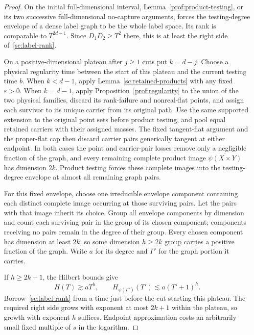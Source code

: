 \begin{proof}
On the initial full-dimensional interval,
Lemma~\ref{prof:product-testing}, or its two successive
full-dimensional no-capture arguments, forces the testing-degree
envelope of a dense label graph to be the whole label space.
Its rank is comparable to $T^{2d-1}$.  Since $D_1D_2\ge T^2$
there, this is at least the right side of~\eqref{sc:label-rank}.

On a positive-dimensional plateau after $j\ge1$ cuts put
$k=d-j$.  Choose a physical regularity time between the start of this
plateau and the current testing time $b$.
When $k<d-1$, apply Lemma~\ref{sc:retained-products} with any fixed
$\varepsilon>0$.  When $k=d-1$, apply
Proposition~\ref{prof:regularity} to the union of the two physical
families, discard its rank-failure and nonreal-flat points, and assign each
survivor to its unique carrier from its original path.  Use the same
supported extension to the original point sets before product testing,
and pool equal retained carriers with their assigned masses.  The fixed
tangent-flat argument and the proper-flat
cap then discard carrier pairs generically tangent at either endpoint.
In both cases the point and carrier-pair losses remove only a negligible
fraction of the graph, and every remaining complete product image
$\overline{\psi(X\times Y)}$ has dimension $2k$.
Product testing forces these complete images into the testing-degree
envelope at almost all remaining graph pairs.

For this fixed envelope, choose one irreducible envelope component
containing each distinct complete image occurring at those surviving
pairs.  Let the pairs with that image inherit its choice.  Group all
envelope components by dimension and count each surviving pair in the
group of its chosen component; components receiving no pairs remain in
the degree of their group.  Every chosen component has dimension at
least $2k$, so some dimension $h\ge2k$ group carries a positive
fraction of the graph.  Write $a$ for its degree and $\Gamma'$ for
the graph portion it carries.

If $h\ge2k+1$, the Hilbert bounds give
\[
 H(T)\gtrsim aT^h,\qquad
 H_{\psi(\Gamma')}(T')\lesssim a(T'+1)^h.
\]
Borrow~\eqref{sc:label-rank} from a time just before the cut
starting this plateau.  The required right side grows with
exponent at most $2k+1$ within the plateau, so growth with
exponent $h$ suffices.  Endpoint approximation costs an
arbitrarily small fixed multiple of $s$ in the logarithm.


\end{proof}
